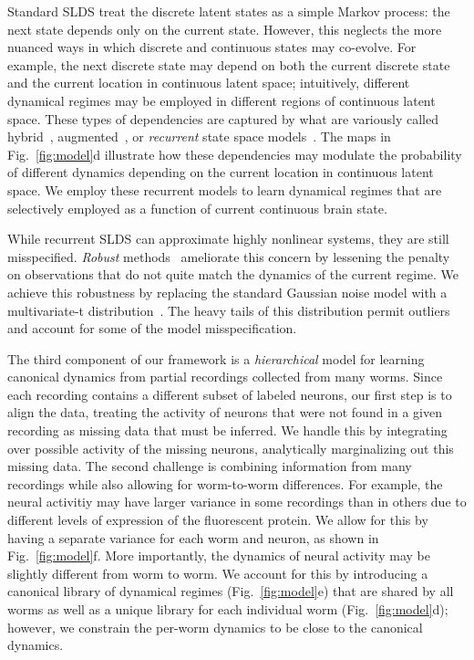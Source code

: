 \documentclass[11pt]{article}
\begin{document}
Standard SLDS treat the discrete latent states as a simple Markov
process: the next state depends only on the current state. However,
this neglects the more nuanced ways in which discrete and continuous
states may co-evolve. For example, the next discrete state may depend
on both the current discrete state and the current location in
continuous latent space; intuitively, different dynamical regimes may
be employed in different regions of continuous latent space. These
types of dependencies are captured by what are variously called
hybrid~\citep{paoletti2007identification},
augmented~\citep{barber2006expectation}, or \emph{recurrent} state
space models~\citep{linderman2017recurrent}. The maps in
Fig.~\ref{fig:model}d illustrate how these dependencies may modulate
the probability of different dynamics depending on the current
location in continuous latent space. We employ these recurrent models
to learn dynamical regimes that are selectively employed as a
function of current continuous brain state.

While recurrent SLDS can approximate highly nonlinear systems, they
are still misspecified. \emph{Robust} methods~\citep{huber1981robust}
ameliorate this concern by lessening the penalty on observations that
do not quite match the dynamics of the current regime.  We achieve
this robustness by replacing the standard Gaussian noise model with a
multivariate-t distribution~\citep{lange1989robust}.  The heavy tails
of this distribution permit outliers and account for some of the model
misspecification.

The third component of our framework is a \emph{hierarchical} model
for learning canonical dynamics from partial recordings collected from
many worms.  Since each recording contains a different subset of
labeled neurons, our first step is to align the data, treating the
activity of neurons that were not found in a given recording as
missing data that must be inferred.  We handle this by integrating
over possible activity of the missing neurons, analytically
marginalizing out this missing data.  The second challenge is
combining information from many recordings while also allowing for
worm-to-worm differences.  For example, the neural activitiy may have
larger variance in some recordings than in others due to different
levels of expression of the fluorescent protein.  We allow for this by
having a separate variance for each worm and neuron, as shown in
Fig.~\ref{fig:model}f.  More importantly, the dynamics of neural
activity may be slightly different from worm to worm.  We account for
this by introducing a canonical library of dynamical regimes
(Fig.~\ref{fig:model}e) that are shared by all worms as well as a
unique library for each individual worm (Fig.~\ref{fig:model}d);
however, we constrain the per-worm dynamics to be close to the
canonical dynamics.
\end{document}
